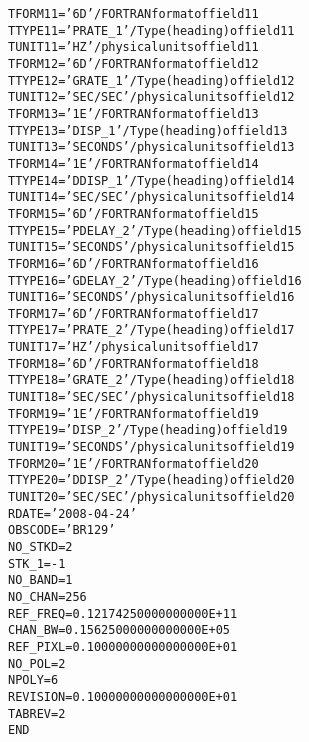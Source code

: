 \documentclass[twoside]{article}
\begin{document}
\begin{alltt}
TFORM11 = '6D      '           / FORTRAN format of field 11
TTYPE11 = 'PRATE_1         '   / Type (heading) of field 11
TUNIT11 = 'HZ      '           / physical units of field 11
TFORM12 = '6D      '           / FORTRAN format of field 12
TTYPE12 = 'GRATE_1         '   / Type (heading) of field 12
TUNIT12 = 'SEC/SEC '           / physical units of field 12
TFORM13 = '1E      '           / FORTRAN format of field 13
TTYPE13 = 'DISP_1          '   / Type (heading) of field 13
TUNIT13 = 'SECONDS '           / physical units of field 13
TFORM14 = '1E      '           / FORTRAN format of field 14
TTYPE14 = 'DDISP_1         '   / Type (heading) of field 14
TUNIT14 = 'SEC/SEC '           / physical units of field 14
TFORM15 = '6D      '           / FORTRAN format of field 15
TTYPE15 = 'PDELAY_2        '   / Type (heading) of field 15
TUNIT15 = 'SECONDS '           / physical units of field 15
TFORM16 = '6D      '           / FORTRAN format of field 16
TTYPE16 = 'GDELAY_2        '   / Type (heading) of field 16
TUNIT16 = 'SECONDS '           / physical units of field 16
TFORM17 = '6D      '           / FORTRAN format of field 17
TTYPE17 = 'PRATE_2         '   / Type (heading) of field 17
TUNIT17 = 'HZ      '           / physical units of field 17
TFORM18 = '6D      '           / FORTRAN format of field 18
TTYPE18 = 'GRATE_2         '   / Type (heading) of field 18
TUNIT18 = 'SEC/SEC '           / physical units of field 18
TFORM19 = '1E      '           / FORTRAN format of field 19
TTYPE19 = 'DISP_2          '   / Type (heading) of field 19
TUNIT19 = 'SECONDS '           / physical units of field 19
TFORM20 = '1E      '           / FORTRAN format of field 20
TTYPE20 = 'DDISP_2         '   / Type (heading) of field 20
TUNIT20 = 'SEC/SEC '           / physical units of field 20
RDATE   = '2008-04-24'
OBSCODE = 'BR129   '
NO_STKD =            2
STK_1   =           -1
NO_BAND =            1
NO_CHAN =          256
REF_FREQ=   0.12174250000000000E+11
CHAN_BW =   0.15625000000000000E+05
REF_PIXL=   0.10000000000000000E+01
NO_POL  =            2
NPOLY   =            6
REVISION=   0.10000000000000000E+01
TABREV  =            2
END
\end{alltt}
\end{document}
